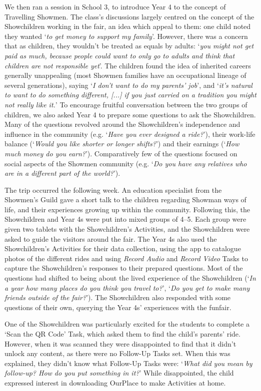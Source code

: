 We then ran a session in School 3, to introduce Year 4 to the concept of Travelling Showmen. The class's discussions largely centred on the concept of the Showchildren working in the fair, an idea which appeal to them: one child noted they wanted `\textit{to get money to support my family}'. However, there was a concern that as children, they wouldn't be treated as equals by adults: `\textit{you might not get paid as much, because people could want to only go to adults and think that children are not responsible yet}'. The children found the idea of inherited careers generally unappealing (most Showmen families have an occupational lineage of several generations), saying `\textit{I don't want to do my parents' job}', and `\textit{it's natural to want to do something different, [...] if you just carried on a tradition you might not really like it.}' To encourage fruitful conversation between the two groups of children, we also asked Year 4 to prepare some questions to ask the Showchildren. Many of the questions revolved around the Showchildren's independence and influence in the community (e.g. `\textit{Have you ever designed a ride?}'), their work-life balance (`\textit{Would you like shorter or longer shifts?}') and their earnings (`\textit{How much money do you earn?}'). Comparatively few of the questions focused on social aspects of the Showmen community (e.g. `\textit{Do you have any relatives who are in a different part of the world?}').

The trip occurred the following week. An education specialist from the Showmen's Guild gave a short talk to the children regarding Showman ways of life, and their experiences growing up within the community. Following this, the Showchildren and Year 4s were put into mixed groups of 4--5. Each group were given two tablets with the Showchildren's Activities, and the Showchildren were asked to guide the visitors around the fair. The Year 4s also used the Showchildren's Activities for their data collection, using the app to catalogue photos of the different rides and using \textit{Record Audio} and \textit{Record Video} Tasks to capture the Showchildren's responses to their prepared questions. Most of the questions had shifted to being about the lived experience of the Showchildren (`\textit{In a year how many places do you think you travel to?}', `\textit{Do you get to make many friends outside of the fair?}'). The Showchildren also responded with some questions of their own, querying the Year 4s' experiences with the funfair.

One of the Showchildren was particularly excited for the students to complete a `Scan the QR Code' Task, which asked them to find the child's parents' ride. However, when it was scanned they were disappointed to find that it didn't unlock any content, as there were no Follow-Up Tasks set. When this was explained, they didn't know what Follow-Up Tasks were: `\textit{What did you mean by follow-up? How do you put something in it?}' While disappointed, the child expressed interest in downloading OurPlace to make Activities at home.


